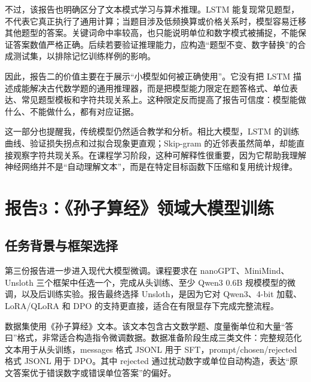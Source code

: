 \documentclass[a4paper,11pt,twocolumn]{article}
\begin{document}
不过，该报告也明确区分了文本模式学习与算术推理。LSTM 能复现常见题型，不代表它真正执行了通用计算；当题目涉及低频换算或价格关系时，模型容易迁移其他题型的答案。关键词命中率较高，也只能说明单位和数字模式被捕捉，不能保证答案数值严格正确。后续若要验证推理能力，应构造“题型不变、数字替换”的合成测试集，以排除记忆训练样例的影响。

因此，报告二的价值主要在于展示“小模型如何被正确使用”。它没有把 LSTM 描述成能解决古代数学题的通用推理器，而是把模型能力限定在题答格式、单位表达、常见题型模板和字符共现关系上。这种限定反而提高了报告可信度：模型能做什么、不能做什么，都有对应证据。

这一部分也提醒我，传统模型仍然适合教学和分析。相比大模型，LSTM 的训练曲线、验证损失拐点和过拟合现象更直观；Skip-gram 的近邻表虽然简单，却能直接观察字符共现关系。在课程学习阶段，这种可解释性很重要，因为它帮助我理解神经网络并不是“自动理解文本”，而是在特定目标函数下压缩和复用统计规律。

\section{报告3：《孙子算经》领域大模型训练}

\subsection{任务背景与框架选择}

第三份报告进一步进入现代大模型微调。课程要求在 nanoGPT、MiniMind、Unsloth 三个框架中任选一个，完成从头训练、至少 Qwen3 0.6B 规模模型的微调，以及后训练实验。报告最终选择 Unsloth，是因为它对 Qwen3、4-bit 加载、LoRA/QLoRA 和 DPO 的支持更直接，适合在有限显存下完成完整流程。

\begin{table}[H]
\centering
\scriptsize
\caption{框架选择的比较}
\end{table}

数据集使用《孙子算经》文本。该文本包含古文数学题、度量衡单位和大量“答曰”格式，非常适合构造指令微调数据。数据准备阶段生成三类文件：完整规范化文本用于从头训练，messages 格式 JSONL 用于 SFT，prompt/chosen/rejected 格式 JSONL 用于 DPO。其中 rejected 通过扰动数字或单位自动构造，表达“原文答案优于错误数字或错误单位答案”的偏好。
\end{document}
